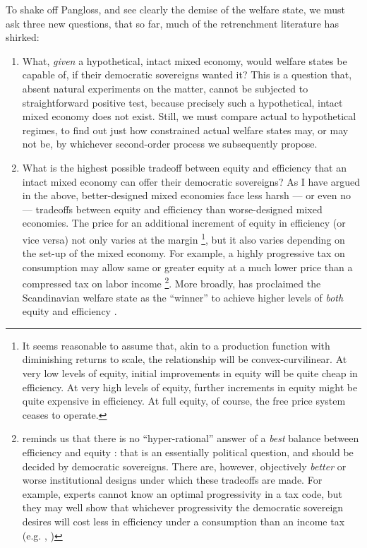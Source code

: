 \documentclass[11pt,a4paper,oneside,openright]{article}
\begin{document}

To shake off Pangloss, and see clearly the demise of the welfare state, we must ask three new questions, that so far, much of the retrenchment literature has shirked:
\begin{enumerate}
	\item What, \emph{given} a hypothetical, intact mixed economy, would welfare states be capable of, if their democratic sovereigns wanted it? 
	This is a question that, absent natural experiments on the matter, cannot be subjected to straightforward positive test, because precisely such a hypothetical, intact mixed economy does not exist. 
	Still, we must compare actual to hypothetical regimes, to find out just how constrained actual welfare states may, or may not be, by whichever second-order process we subsequently propose.
	
	\item What is the highest possible tradeoff between equity and efficiency that an intact mixed economy can offer their democratic sovereigns? 
	As I have argued in the above, better-designed mixed economies face less harsh --- or even no --- tradeoffs between equity and efficiency than worse-designed mixed economies. 
	The price for an additional increment of equity in efficiency (or vice versa) not only varies at the margin
	\footnote{
		It seems reasonable to assume that, akin to a production function with diminishing returns to scale, the relationship will be convex-curvilinear. 
		At very low levels of equity, initial improvements in equity will be quite cheap in efficiency. 
		At very high levels of equity, further increments in equity might be quite expensive in efficiency. 
		At full equity, of course, the free price system ceases to operate.
	}, 
	but it also varies depending on the set-up of the mixed economy. 
	For example, a highly progressive tax on consumption may allow same or greater equity at a much lower price than a compressed tax on labor income
	\footnote{
		\citeauthor{Offe2003} reminds us that there is no ``hyper-rational'' answer of a \emph{best} balance between efficiency and equity \citeyearpar[445]{Offe2003}: 
		that is an essentially political question, and should be decided by democratic sovereigns. 
		There are, however, objectively \emph{better} or {worse} institutional designs under which these tradeoffs are made. 
		For example, experts cannot know an optimal progressivity in a tax code, but they may well show that whichever progressivity the democratic sovereign desires will cost less in efficiency under a consumption than an income tax (e.g. \citealt{McCaffery2005}, \citealt{Frank2005})
	}.
	More broadly, \citeauthor{Ganßmann2010} has proclaimed the Scandinavian welfare state as the ``winner'' to achieve higher levels of \emph{both} equity and efficiency \citeyearpar[343]{Ganßmann2010}.
	

\end{enumerate}
\end{document}
